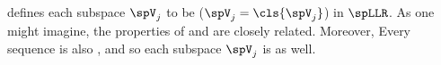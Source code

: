  defines each subspace $\spV_j$ to be  ($\spV_j=\cls{\spV_j}$) in $\spLLR$.
As one might imagine, the properties of and 
are closely related. %
Moreover, Every  sequence is also ,
and so each subspace $\spV_j$ is  as well. %




